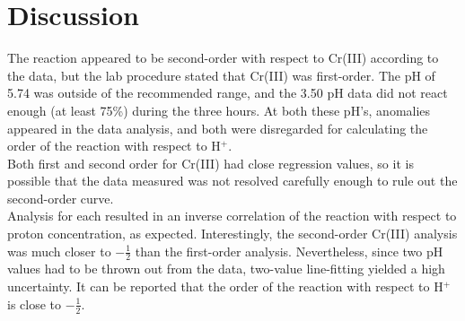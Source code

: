 \documentclass[11pt]{article}
\newcommand{\super}[1]{\ensuremath{^{\textrm{#1}}}}
\begin{document}
\section{Discussion}

The reaction appeared to be second-order with respect to Cr(III) according to the data, but the lab procedure\cite{lab} stated that Cr(III) was first-order. The pH of 5.74 was outside of the recommended range,\cite{lab} and the 3.50 pH data did not react enough (at least 75\%)\cite{lab} during the three hours. At both these pH's, anomalies appeared in the data analysis, and both were disregarded for calculating the order of the reaction with respect to H\super{+}. \\

Both first and second order for Cr(III) had close regression values, so it is possible that the data measured was not resolved carefully enough to rule out the second-order curve. \\

Analysis for each resulted in an inverse correlation of the reaction with respect to proton concentration, as expected.\cite{lab} Interestingly, the second-order Cr(III) analysis was much closer to $-\frac{1}{2}$ than the first-order analysis. Nevertheless, since two pH values had to be thrown out from the data, two-value line-fitting yielded a high uncertainty. It can be reported that the order of the reaction with respect to H\super{+} is close to $-\frac{1}{2}$. \\




\raggedright




\end{document}
